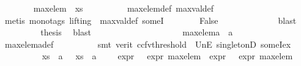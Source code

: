 \begin{isabellebody}
\ \ \ \ \ \ \isamarkupfalse%
\ {\isachardoublequoteopen}max{\isacharunderscore}{\kern0pt}elem\ {\isasymin}\ xs{\isachardoublequoteclose}\isanewline
\ \ \ \ \ \ \ \ \isamarkupfalse%
\ max{\isacharunderscore}{\kern0pt}elem{\isacharunderscore}{\kern0pt}def\ max{\isacharunderscore}{\kern0pt}val{\isacharunderscore}{\kern0pt}def\ \isanewline
\ \ \ \ \ \ \ \ \isamarkupfalse%
\ {\isacharparenleft}{\kern0pt}metis\ {\isacharparenleft}{\kern0pt}mono{\isacharunderscore}{\kern0pt}tags{\isacharcomma}{\kern0pt}\ lifting{\isacharparenright}{\kern0pt}\ {\isachardoublequoteopen}{}{\isachardoublequoteclose}\ max{\isacharunderscore}{\kern0pt}val{\isacharunderscore}{\kern0pt}def\ someI{\isacharparenright}{\kern0pt}\isanewline
\ \ \ \ \ \ \isamarkupfalse%
\ False\ \isamarkupfalse%
\ {}\ \isanewline
\ \ \ \ \ \ \ \ \isamarkupfalse%
\ blast\isanewline
\ \ \ \ \ \ \isamarkupfalse%
\ \isamarkupfalse%
\ {\isacharquery}{\kern0pt}thesis\ \isamarkupfalse%
\ blast\isanewline
\ \ \ \ \isamarkupfalse%
\isanewline
\ \ \ \ \ \ \isamarkupfalse%
\ {}\isanewline
\ \ \ \ \ \ \isamarkupfalse%
\ {\isachardoublequoteopen}max{\isacharunderscore}{\kern0pt}elem{\isacharunderscore}{\kern0pt}a\ {\isacharequal}{\kern0pt}\ a{\isachardoublequoteclose}\isanewline
\ \ \ \ \ \ \ \ \isamarkupfalse%
\ max{\isacharunderscore}{\kern0pt}elem{\isacharunderscore}{\kern0pt}a{\isacharunderscore}{\kern0pt}def\isanewline
\ \ \ \ \ \ \ \ \isamarkupfalse%
\ {\isacharparenleft}{\kern0pt}smt\ {\isacharparenleft}{\kern0pt}verit{\isacharcomma}{\kern0pt}\ ccfv{\isacharunderscore}{\kern0pt}threshold{\isacharparenright}{\kern0pt}\ {\isachardoublequoteopen}{}{\isachardoublequoteclose}\ UnE\ singletonD\ someI{\isacharunderscore}{\kern0pt}ex{\isacharparenright}{\kern0pt}\isanewline
\ \ \ \ \ \ \isamarkupfalse%
\ {\isachardoublequoteopen}{\isasymexists}{\isasymphi}\ {\isasymin}\ {\isacharparenleft}{\kern0pt}xs\ {\isasymunion}\ {\isacharbraceleft}{\kern0pt}a{\isacharbraceright}{\kern0pt}{\isacharparenright}{\kern0pt}{\isachardot}{\kern0pt}\ {\isasymexists}{\isasympsi}\ {\isasymin}\ {\isacharparenleft}{\kern0pt}xs\ {\isasymunion}\ {\isacharbraceleft}{\kern0pt}a{\isacharbraceright}{\kern0pt}{\isacharparenright}{\kern0pt}{\isachardot}{\kern0pt}\ {\isasymphi}\ {\isasymnoteq}\ {\isasympsi}\ {\isasymand}\ expr{\isacharunderscore}{\kern0pt}{}\ {\isasymphi}\ {\isasymge}\ expr{\isacharunderscore}{\kern0pt}{}\ max{\isacharunderscore}{\kern0pt}elem\ {\isasymand}\ expr{\isacharunderscore}{\kern0pt}{}\ {\isasympsi}\ {\isasymge}\ expr{\isacharunderscore}{\kern0pt}{}\ max{\isacharunderscore}{\kern0pt}elem{\isachardoublequoteclose}\isanewline

\end{isabellebody}
